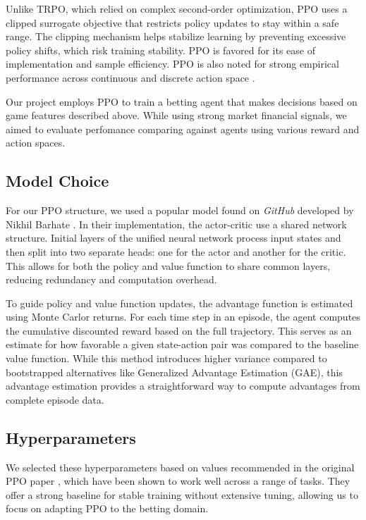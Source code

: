 \documentclass[sigconf]{acmart}
\begin{document}
Unlike TRPO, which relied on complex second-order optimization, PPO uses a clipped surrogate objective that restricts policy updates to stay within a safe range. The clipping mechanism helps stabilize learning by preventing excessive policy shifts, which risk training stability. PPO is favored for its ease of implementation and sample efficiency. PPO is also noted for strong empirical performance across continuous and discrete action space \cite{schulman2017proximalpolicyoptimizationalgorithms}.

Our project employs PPO to train a betting agent that makes decisions based on game features described above. While using strong market financial signals, we aimed to evaluate perfomance comparing against agents using various reward and action spaces.

\subsection{Model Choice}

   For our PPO structure, we used a popular model found on \textit{GitHub} developed by Nikhil Barhate \cite{barhate2020ppo}. In their implementation, the actor-critic use a shared network structure. Initial layers of the unified neural network process input states and then split into two separate heads: one for the actor and another for the critic. This allows for both the policy and value function to share common layers, reducing redundancy and computation overhead.

   To guide policy and value function updates, the advantage function is estimated using Monte Carlor returns. For each time step in an episode, the agent computes the cumulative discounted reward based on the full trajectory. This serves as an estimate for how favorable a given state-action pair was compared to the baseline value function. While this method introduces higher variance compared to bootstrapped alternatives like Generalized Advantage Estimation (GAE), this advantage estimation provides a straightforward way to compute advantages from complete episode data. 

\subsection{Hyperparameters}

We selected these hyperparameters based on values recommended in the original PPO paper \cite{schulman2017proximalpolicyoptimizationalgorithms}, which have been shown to work well across a range of tasks. They offer a strong baseline for stable training without extensive tuning, allowing us to focus on adapting PPO to the betting domain.
\end{document}
